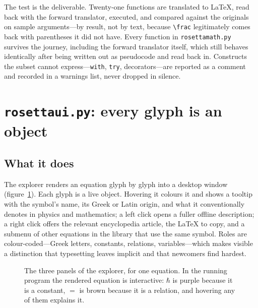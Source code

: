 \documentclass[11pt]{article}
\begin{document}
The test is the deliverable. Twenty-one functions are translated to \LaTeX{},
read back with the forward translator, executed, and compared against the
originals on sample arguments---by result, not by text, because \verb|\frac|
legitimately comes back with parentheses it did not have. Every function in
\texttt{rosettamath.py} survives the journey, including the forward translator
itself, which still behaves identically after being written out as pseudocode
and read back in. Constructs the subset cannot express---\verb|with|,
\verb|try|, decorators---are reported as a comment and recorded in a warnings
list, never dropped in silence.

\section{\texttt{rosettaui.py}: every glyph is an object}
\label{sec:rosettaui}

\subsection{What it does}

The explorer renders an equation glyph by glyph into a desktop window
(figure~\ref{fig:ui}). Each glyph is a live object. Hovering it colours it and
shows a tooltip with the symbol's name, its Greek or Latin origin, and what it
conventionally denotes in physics and mathematics; a left click opens a fuller
offline description; a right click offers the relevant encyclopedia article,
the \LaTeX{} to copy, and a submenu of other equations in the library that use
the same symbol. Roles are colour-coded---Greek letters, constants, relations,
variables---which makes visible a distinction that typesetting leaves implicit
and that newcomers find hardest.

\begin{figure}[h]
\centering
{}
\caption{The three panels of the explorer, for one equation. In the running
program the rendered equation is interactive: $\hbar$ is purple because it is a
constant, $=$ is brown because it is a relation, and hovering any of them
explains it.}
\label{fig:ui}
\end{figure}
\end{document}
